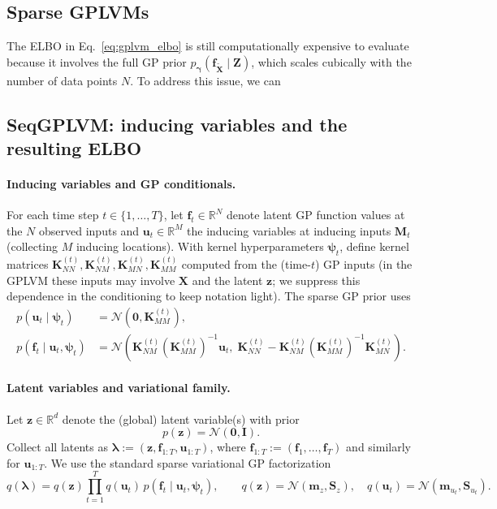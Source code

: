 \subsection{Sparse GPLVMs}
The ELBO in Eq.~\ref{eq:gplvm_elbo} is still computationally expensive to evaluate
because it involves the full GP prior \(p_{\boldsymbol{\gamma}}(\mathbf{f}_{\widetilde{\mathbf{X}}} \mid \mathbf{Z})\), which 
scales cubically with the number of data points \(N\). To address this issue, we can
\subsection{SeqGPLVM: inducing variables and the resulting ELBO}

\paragraph{Inducing variables and GP conditionals.}
For each time step \(t\in\{1,\dots,T\}\), let \(\mathbf{f}_t\in\mathbb{R}^{N}\) denote latent GP function values at the \(N\) observed inputs and \(\mathbf{u}_t\in\mathbb{R}^{M}\) the inducing variables at inducing inputs \(\mathbf{M}_t\) (collecting \(M\) inducing locations). With kernel hyperparameters \(\boldsymbol{\psi}_t\), define kernel matrices
\(
\mathbf{K}^{(t)}_{NN}, \mathbf{K}^{(t)}_{NM}, \mathbf{K}^{(t)}_{MN}, \mathbf{K}^{(t)}_{MM}
\)
computed from the (time-\(t\)) GP inputs (in the GPLVM these inputs may involve \(\mathbf{X}\) and the latent \(\mathbf{z}\); we suppress this dependence in the conditioning to keep notation light).
The sparse GP prior uses
\begin{align}
p(\mathbf{u}_t\mid \boldsymbol{\psi}_t) &= \mathcal{N}\!\left(\mathbf{0},\mathbf{K}^{(t)}_{MM}\right),
\\
p(\mathbf{f}_t\mid \mathbf{u}_t,\boldsymbol{\psi}_t)
&=\mathcal{N}\!\left(
\mathbf{K}^{(t)}_{NM}(\mathbf{K}^{(t)}_{MM})^{-1}\mathbf{u}_t,\;
\mathbf{K}^{(t)}_{NN}-\mathbf{K}^{(t)}_{NM}(\mathbf{K}^{(t)}_{MM})^{-1}\mathbf{K}^{(t)}_{MN}
\right).
\label{eq:gp-conditional}
\end{align}

\paragraph{Latent variables and variational family.}
Let \(\mathbf{z}\in\mathbb{R}^{d}\) denote the (global) latent variable(s) with prior
\begin{equation}
p(\mathbf{z})=\mathcal{N}(\mathbf{0},\mathbf{I}).
\label{eq:z-prior}
\end{equation}
Collect all latents as
\(
\boldsymbol{\lambda} := (\mathbf{z},\mathbf{f}_{1:T},\mathbf{u}_{1:T})
\),
where \(\mathbf{f}_{1:T}:=(\mathbf{f}_1,\dots,\mathbf{f}_T)\) and similarly for \(\mathbf{u}_{1:T}\).
We use the standard sparse variational GP factorization
\begin{equation}
q(\boldsymbol{\lambda})
=
q(\mathbf{z})\prod_{t=1}^{T} q(\mathbf{u}_t)\,p(\mathbf{f}_t\mid \mathbf{u}_t,\boldsymbol{\psi}_t),
\qquad
q(\mathbf{z})=\mathcal{N}(\mathbf{m}_z,\mathbf{S}_z),
\quad
q(\mathbf{u}_t)=\mathcal{N}(\mathbf{m}_{u_t},\mathbf{S}_{u_t}).
\label{eq:q-factorization}
\end{equation}

